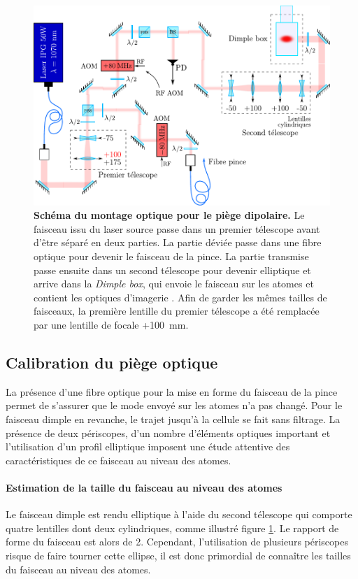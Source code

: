 \begin{figure}
\centering
\includegraphics[width=\textwidth]{Fig/Modif_exp/optique_1070_new_style.pdf}
\caption{\textbf{Schéma du montage optique pour le piège dipolaire.} Le faisceau issu du laser source passe dans un premier télescope avant d'être séparé en deux parties. La partie déviée passe dans une fibre optique pour devenir le faisceau de la pince. La partie transmise passe ensuite dans un second télescope pour devenir elliptique et arrive dans la \emph{Dimple box}, qui envoie le faisceau sur les atomes et contient les optiques d'imagerie \citep{muller2015coherent}. Afin de garder les mêmes tailles de faisceaux, la première lentille du premier télescope a été remplacée par une lentille de focale +\SI{100}{\milli\metre}.}
\label{fig:optique_1070}
\end{figure}


\subsection{Calibration du piège optique}
\label{sc:calibration_piege_optique}
La présence d'une fibre optique pour la mise en forme du faisceau de la pince permet de s'assurer que le mode envoyé sur les atomes n'a pas changé. Pour le faisceau dimple en revanche, le trajet jusqu'à la cellule se fait sans filtrage. La présence de deux périscopes, d'un nombre d'éléments optiques important et l'utilisation d'un profil elliptique imposent une étude attentive des caractéristiques de ce faisceau au niveau des atomes.



\paragraph*{Estimation de la taille du faisceau au niveau des atomes}
Le faisceau dimple est rendu elliptique à l'aide du second télescope qui comporte quatre lentilles dont deux cylindriques, comme illustré figure \ref{fig:optique_1070}. Le rapport de forme du faisceau est alors de 2. Cependant, l'utilisation de plusieurs périscopes risque de faire tourner cette ellipse, il est donc primordial de connaître les tailles du faisceau au niveau des atomes.

